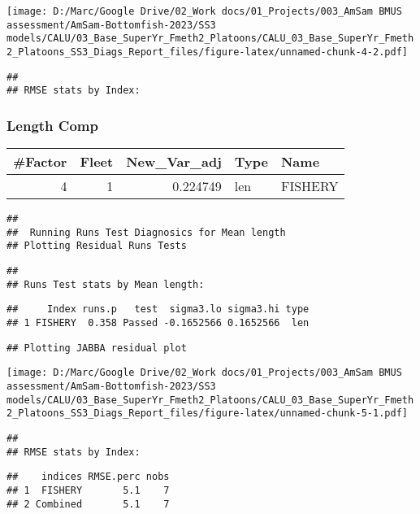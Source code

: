 \documentclass[
]{article}
\begin{document}
\texttt{[image: D:/Marc/Google Drive/02\_Work docs/01\_Projects/003\_AmSam BMUS assessment/AmSam-Bottomfish-2023/SS3 models/CALU/03\_Base\_SuperYr\_Fmeth2\_Platoons/CALU\_03\_Base\_SuperYr\_Fmeth2\_Platoons\_SS3\_Diags\_Report\_files/figure-latex/unnamed-chunk-4-2.pdf]}

\begin{verbatim}
## 
## RMSE stats by Index:
\end{verbatim}

\hypertarget{length-comp}{%
\subsubsection{Length Comp}\label{length-comp}}

\captionsetup[table]{labelformat=empty,skip=1pt}
\begin{longtable}{rrrll}
\toprule
\#Factor & Fleet & New\_Var\_adj & Type & Name \\ 
\midrule
4 & 1 & 0.224749 & len & FISHERY \\ 
\bottomrule
\end{longtable}

\begin{verbatim}
## 
##  Running Runs Test Diagnosics for Mean length 
## Plotting Residual Runs Tests
\end{verbatim}

\begin{verbatim}
## 
## Runs Test stats by Mean length:
\end{verbatim}

\begin{verbatim}
##     Index runs.p   test  sigma3.lo sigma3.hi type
## 1 FISHERY  0.358 Passed -0.1652566 0.1652566  len
\end{verbatim}

\begin{verbatim}
## Plotting JABBA residual plot
\end{verbatim}

\texttt{[image: D:/Marc/Google Drive/02\_Work docs/01\_Projects/003\_AmSam BMUS assessment/AmSam-Bottomfish-2023/SS3 models/CALU/03\_Base\_SuperYr\_Fmeth2\_Platoons/CALU\_03\_Base\_SuperYr\_Fmeth2\_Platoons\_SS3\_Diags\_Report\_files/figure-latex/unnamed-chunk-5-1.pdf]}

\begin{verbatim}
## 
## RMSE stats by Index:
\end{verbatim}

\begin{verbatim}
##    indices RMSE.perc nobs
## 1  FISHERY       5.1    7
## 2 Combined       5.1    7
\end{verbatim}
\end{document}
